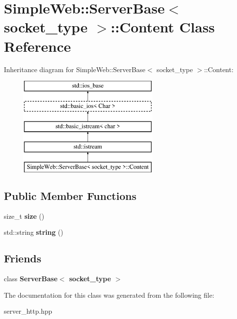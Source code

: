 \hypertarget{a00065}{}\section{Simple\+Web\+:\+:Server\+Base$<$ socket\+\_\+type $>$\+:\+:Content Class Reference}
\label{a00065}
Inheritance diagram for Simple\+Web\+:\+:Server\+Base$<$ socket\+\_\+type $>$\+:\+:Content\+:\begin{figure}[H]
\begin{center}
\leavevmode
\includegraphics[height=5.000000cm]{a00065}
\end{center}
\end{figure}
\subsection*{Public Member Functions}
\begin{DoxyCompactItemize}
\item 
size\+\_\+t {\bfseries size} ()\hypertarget{a00065_adf8b2386c8ab32277341c6ae07cd4670}{}\label{a00065_adf8b2386c8ab32277341c6ae07cd4670}

\item 
std\+::string {\bfseries string} ()\hypertarget{a00065_a6b4a72b0631c88ef576db28f54a768cb}{}\label{a00065_a6b4a72b0631c88ef576db28f54a768cb}

\end{DoxyCompactItemize}
\subsection*{Friends}
\begin{DoxyCompactItemize}
\item 
class {\bfseries Server\+Base$<$ socket\+\_\+type $>$}\hypertarget{a00065_a01d54a7e16ca437c98ec571deca98dfc}{}\label{a00065_a01d54a7e16ca437c98ec571deca98dfc}

\end{DoxyCompactItemize}


The documentation for this class was generated from the following file\+:\begin{DoxyCompactItemize}
\item 
server\+\_\+http.\+hpp\end{DoxyCompactItemize}
